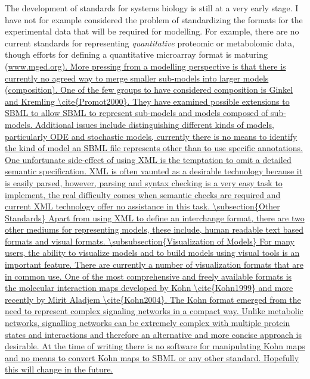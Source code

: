 \documentclass[12pt]{article}
\begin{document}
The development of standards for systems biology is still at a
very early stage. I have not for example considered the problem of
standardizing the formats for the experimental data that will be
required for modelling. For example, there are no current standards
for representing {\em quantitative} proteomic or metabolomic data, though efforts
for defining a quantitative microarray format is maturing (\url{www.mged.org).

More pressing from a modelling perspective is that there is currently no agreed way to merge smaller sub-models into larger models (composition). One of the few groups to have considered composition is Ginkel and Kremling \cite{Promot2000}. They have examined possible extensions to SBML to allow SBML to represent sub-models and models composed of sub-models. Additional issues include distinguishing different kinds of models, particularly ODE and stochastic models, currently there is no means to identify the kind of model an SBML file represents other than to use specific annotations. One unfortunate side-effect of using XML is the temptation to omit a detailed semantic specification. XML is often vaunted as a desirable technology because it is easily parsed, however, parsing and syntax checking is a very easy task to implement, the real difficulty comes when semantic checks are required and current XML technology offer no assistance in this task.

\subsection{Other Standards}

Apart from using XML to define an interchange format, there are two other mediums
for representing models, these include, human readable text based formats and
visual formats.

\subsubsection{Visualization of Models}

For many users, the ability to visualize models and to build
models using visual tools is an important feature. There are currently
a number of visualization formats that are in common use. One of the
most comprehensive and freely available formats is the molecular interaction
maps developed by Kohn \cite{Kohn1999} and more recently by Mirit Aladjem \cite{Kohn2004}. The
Kohn format emerged from the need to represent complex signaling networks in
a compact way. Unlike metabolic networks, signalling networks can be extremely
complex with multiple protein states and interactions and therefore an alternative and more
concise approach is desirable. At the time of writing
there is no software for manipulating Kohn maps and no means to convert
Kohn maps to SBML or any other standard. Hopefully this will change in the future.

}
\end{document}
